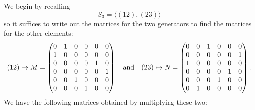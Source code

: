 \documentclass[12pt]{memoir}
\begin{document}
\begin{ptcbr}
We begin by recalling 
$$S_3=\langle (12),(23)\rangle$$ 
so it suffices to write out the matrices for the two generators to find the matrices for the other elements:
$$(12)\mapsto M=\begin{pmatrix}
    0&1&0&0&0&0\\
    1&0&0&0&0&0\\
    0&0&0&0&1&0\\
    0&0&0&0&0&1\\
    0&0&1&0&0&0\\
    0&0&0&1&0&0
\end{pmatrix}
\quad\text{and}\quad
(23)\mapsto N=\begin{pmatrix}
    0&0&1&0&0&0\\
    0&0&0&0&0&1\\
    1&0&0&0&0&0\\
    0&0&0&0&1&0\\
    0&0&0&1&0&0\\
    0&1&0&0&0&0
\end{pmatrix}.$$
We have the following matrices obtained by multiplying these two:
\begin{itemize}
\end{itemize}
\end{ptcbr}
\end{document}
